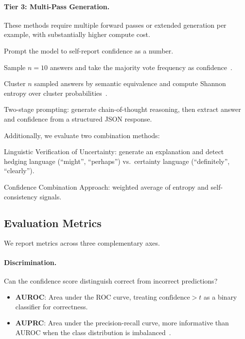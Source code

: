 \documentclass[11pt,a4paper]{article}
\begin{document}
\paragraph{Tier 3: Multi-Pass Generation.}
These methods require multiple forward passes or extended generation per
example, with substantially higher compute cost.

\begin{description}[nosep,leftmargin=1.5em]
  \item[Verbalized] Prompt the model to self-report confidence as a
        number.
  \item[Self-Consistency] Sample $n=10$ answers and take the majority
        vote frequency as confidence~\cite{wang2023selfconsistency}.
  \item[Semantic Entropy] Cluster $n$ sampled answers by semantic
        equivalence and compute Shannon entropy over cluster
        probabilities~\cite{kuhn2023semantic}.
  \item[CoT Confidence] Two-stage prompting: generate chain-of-thought
        reasoning, then extract answer and confidence from a structured
        JSON response.
\end{description}

Additionally, we evaluate two combination methods:
\begin{description}[nosep,leftmargin=1.5em]
  \item[LVU] Linguistic Verification of Uncertainty: generate an
        explanation and detect hedging language (``might'', ``perhaps'')
        vs.\ certainty language (``definitely'', ``clearly'').
  \item[CoCoA] Confidence Combination Approach: weighted average of
        entropy and self-consistency signals.
\end{description}

\subsection{Evaluation Metrics}

We report metrics across three complementary axes.

\paragraph{Discrimination.}
Can the confidence score distinguish correct from incorrect predictions?

\begin{itemize}[nosep]
  \item \textbf{AUROC}: Area under the ROC curve, treating
        $\text{confidence} > t$ as a binary classifier for correctness.
  \item \textbf{AUPRC}: Area under the precision-recall curve, more
        informative than AUROC when the class distribution is
        imbalanced~\cite{saito2015precision}.
\end{itemize}
\end{document}
